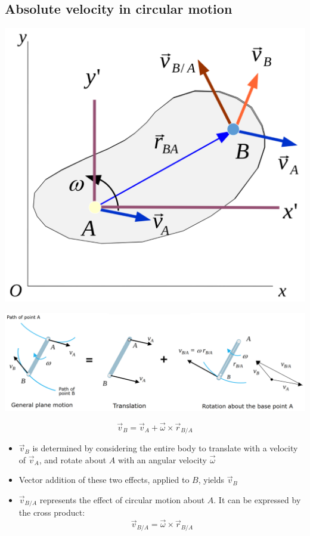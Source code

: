 \documentclass[11pt]{article}
\begin{document}
\subsection{Absolute velocity in circular motion}
\label{sec:org13b7ba8}
\begin{center}
\includegraphics[scale=0.5]{./images/planar-motion-of-a-rigid-slab-velocity.png}
\end{center}

\begin{center}
\includegraphics[width=.9\linewidth]{./images/relative-motion-analysis-velocity.png}
\end{center}
\[\vec{v}_B = \vec{v}_A + \vec{\omega} \times \vec{r}_{B/A}\]

\begin{itemize}
\item \(\vec{v}_B\) is determined by considering the entire body to translate with a velocity of \(\vec{v}_A\), and rotate about \(A\) with an angular velocity \(\vec{\omega}\)
\item Vector addition of these two effects, applied to \(B\), yields \(\vec{v}_B\)
\item \(\vec{v}_{B/A}\) represents the effect of circular motion about \(A\). It can be expressed by the cross product:
\[\vec{v}_{B/A} = \vec{\omega} \times \vec{r}_{B/A}\]
\end{itemize}
\end{document}
